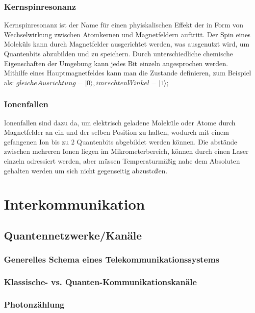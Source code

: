 \subsubsection{Kernspinresonanz}

Kernspinresonanz ist der Name für einen phyiskalischen Effekt der in Form von Wechselwirkung zwischen Atomkernen und Magnetfeldern auftritt. Der Spin eines Moleküls kann durch Magnetfelder ausgerichtet werden, was ausgenutzt wird, um Quantenbits abzubilden und zu speichern. Durch unterschiedliche chemische Eigenschaften der Umgebung kann jedes Bit einzeln angesprochen werden. Mithilfe eines Hauptmagnetfeldes kann man die Zustande definieren, zum Beispiel als: $gleiche Ausrichtung = |0\rangle, im rechten Winkel = |1\rangle$;

\subsubsection{Ionenfallen}

Ionenfallen sind dazu da, um elektrisch geladene Moleküle oder Atome durch Magnetfelder an ein und der selben Position zu halten, wodurch mit einem gefangenen Ion bis zu 2 Quantenbits abgebildet werden können. Die abstände zwischen mehreren Ionen liegen im Mikrometerbereich, können durch einen Laser einzeln adressiert werden, aber müssen Temperaturmäßig nahe dem Absoluten gehalten werden um sich nicht gegenseitig abzustoßen.

\section{Interkommunikation}
\label{sec:Interkommunikation}


\subsection{Quantennetzwerke/Kanäle}
\label{sec:Quantennetzwerke/Kanale}

\subsubsection{Generelles Schema eines Telekommunikationssystems}

\subsubsection{Klassische- vs. Quanten-Kommunikationskanäle}

\subsubsection{Photonzählung}

